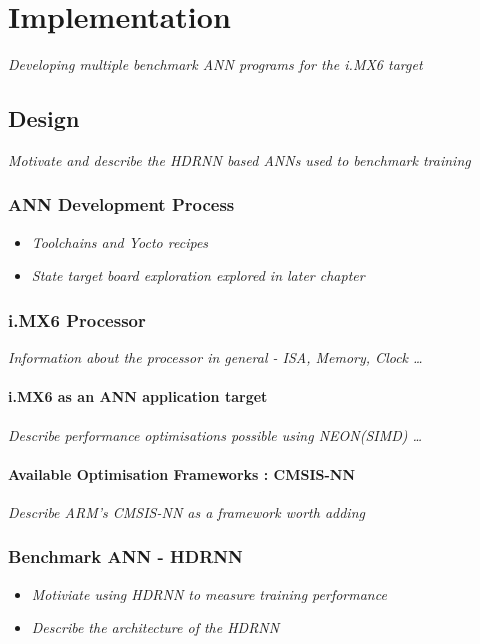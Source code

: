 \part{Implementation}

\textit{Developing multiple benchmark ANN programs for the i.MX6 target}

\chapter{Design}
\textit{Motivate and describe the HDRNN based ANNs used to benchmark training}

\section[Artificial Neural Network Development Process]{ANN Development Process}
\begin{itemize}
	\item \textit{Toolchains and Yocto recipes}
	\item \textit{State target board exploration explored in later chapter}
\end{itemize}

\section[iMX6 Processor]{i.MX6 Processor}
\textit{Information about the processor in general - ISA, Memory, Clock \dots}

\subsection[ANN Acceleration]{i.MX6 as an ANN application target}
\textit{Describe performance optimisations possible using NEON(SIMD) \dots}

\subsection[CMSIS-NN]{Available Optimisation Frameworks : CMSIS-NN}
\textit{Describe ARM's CMSIS-NN as a framework worth adding}

\section[Handwritten Digit Recognition (HDR)]{Benchmark ANN - HDRNN}
\begin{itemize}
	\item \textit{Motiviate using HDRNN to measure training performance}
	\item \textit{Describe the architecture of the HDRNN}
\end{itemize}

